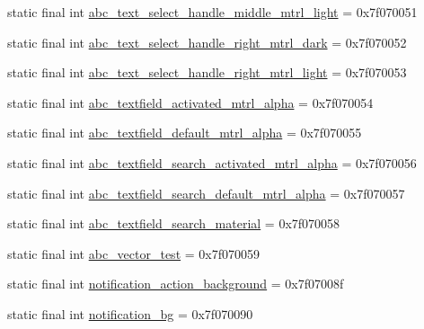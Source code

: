 \begin{DoxyCompactItemize}
\item 
static final int \mbox{\hyperlink{classandroid_1_1support_1_1v7_1_1appcompat_1_1R_1_1drawable_afcedd039cec83d38f6f17910e1f37893}{abc\+\_\+text\+\_\+select\+\_\+handle\+\_\+middle\+\_\+mtrl\+\_\+light}} = 0x7f070051
\item 
static final int \mbox{\hyperlink{classandroid_1_1support_1_1v7_1_1appcompat_1_1R_1_1drawable_a2f2b50c4199149da3511997382c7cb46}{abc\+\_\+text\+\_\+select\+\_\+handle\+\_\+right\+\_\+mtrl\+\_\+dark}} = 0x7f070052
\item 
static final int \mbox{\hyperlink{classandroid_1_1support_1_1v7_1_1appcompat_1_1R_1_1drawable_a9571ee55f1f31cd4cdb2a5abab28b0a6}{abc\+\_\+text\+\_\+select\+\_\+handle\+\_\+right\+\_\+mtrl\+\_\+light}} = 0x7f070053
\item 
static final int \mbox{\hyperlink{classandroid_1_1support_1_1v7_1_1appcompat_1_1R_1_1drawable_ae8bbef6c2b80b044a07e1d6780e06aff}{abc\+\_\+textfield\+\_\+activated\+\_\+mtrl\+\_\+alpha}} = 0x7f070054
\item 
static final int \mbox{\hyperlink{classandroid_1_1support_1_1v7_1_1appcompat_1_1R_1_1drawable_a7c33f295eda00f089cb60a480e595b5e}{abc\+\_\+textfield\+\_\+default\+\_\+mtrl\+\_\+alpha}} = 0x7f070055
\item 
static final int \mbox{\hyperlink{classandroid_1_1support_1_1v7_1_1appcompat_1_1R_1_1drawable_a00703e7605d149c1c96ba37e9a700fe0}{abc\+\_\+textfield\+\_\+search\+\_\+activated\+\_\+mtrl\+\_\+alpha}} = 0x7f070056
\item 
static final int \mbox{\hyperlink{classandroid_1_1support_1_1v7_1_1appcompat_1_1R_1_1drawable_a7f879ca4144a7a5c7ce00c1365719a05}{abc\+\_\+textfield\+\_\+search\+\_\+default\+\_\+mtrl\+\_\+alpha}} = 0x7f070057
\item 
static final int \mbox{\hyperlink{classandroid_1_1support_1_1v7_1_1appcompat_1_1R_1_1drawable_ab7f05c2630051bd2d1746ef890c755fa}{abc\+\_\+textfield\+\_\+search\+\_\+material}} = 0x7f070058
\item 
static final int \mbox{\hyperlink{classandroid_1_1support_1_1v7_1_1appcompat_1_1R_1_1drawable_ac31c3e65556e850c56278ad4e637a344}{abc\+\_\+vector\+\_\+test}} = 0x7f070059
\item 
static final int \mbox{\hyperlink{classandroid_1_1support_1_1v7_1_1appcompat_1_1R_1_1drawable_ab2de29fab5e00c453c246bb047928c54}{notification\+\_\+action\+\_\+background}} = 0x7f07008f
\item 
static final int \mbox{\hyperlink{classandroid_1_1support_1_1v7_1_1appcompat_1_1R_1_1drawable_aa779a928f01e080c4c632654e16b6d6a}{notification\+\_\+bg}} = 0x7f070090

\end{DoxyCompactItemize}
